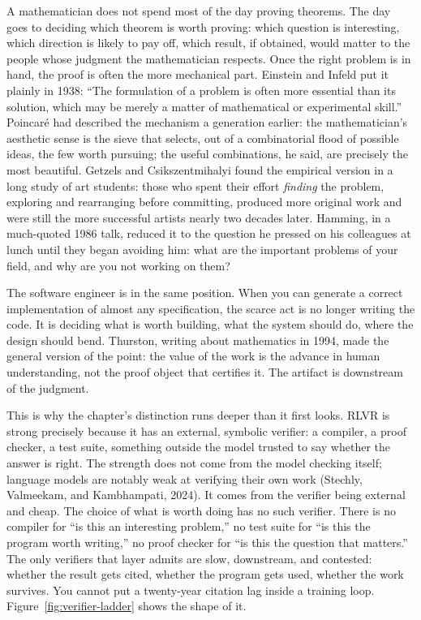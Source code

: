 A mathematician does not spend most of the day proving theorems. The day goes to deciding which theorem is worth proving: which question is interesting, which direction is likely to pay off, which result, if obtained, would matter to the people whose judgment the mathematician respects. Once the right problem is in hand, the proof is often the more mechanical part. Einstein and Infeld put it plainly in 1938: ``The formulation of a problem is often more essential than its solution, which may be merely a matter of mathematical or experimental skill.'' Poincar\'e had described the mechanism a generation earlier: the mathematician's aesthetic sense is the sieve that selects, out of a combinatorial flood of possible ideas, the few worth pursuing; the useful combinations, he said, are precisely the most beautiful. Getzels and Csikszentmihalyi found the empirical version in a long study of art students: those who spent their effort \emph{finding} the problem, exploring and rearranging before committing, produced more original work and were still the more successful artists nearly two decades later. Hamming, in a much-quoted 1986 talk, reduced it to the question he pressed on his colleagues at lunch until they began avoiding him: what are the important problems of your field, and why are you not working on them?

The software engineer is in the same position. When you can generate a correct implementation of almost any specification, the scarce act is no longer writing the code. It is deciding what is worth building, what the system should do, where the design should bend. Thurston, writing about mathematics in 1994, made the general version of the point: the value of the work is the advance in human understanding, not the proof object that certifies it. The artifact is downstream of the judgment.

This is why the chapter's distinction runs deeper than it first looks. RLVR is strong precisely because it has an external, symbolic verifier: a compiler, a proof checker, a test suite, something outside the model trusted to say whether the answer is right. The strength does not come from the model checking itself; language models are notably weak at verifying their own work (Stechly, Valmeekam, and Kambhampati, 2024). It comes from the verifier being external and cheap. The choice of what is worth doing has no such verifier. There is no compiler for ``is this an interesting problem,'' no test suite for ``is this the program worth writing,'' no proof checker for ``is this the question that matters.'' The only verifiers that layer admits are slow, downstream, and contested: whether the result gets cited, whether the program gets used, whether the work survives. You cannot put a twenty-year citation lag inside a training loop. Figure~\ref{fig:verifier-ladder} shows the shape of it.

